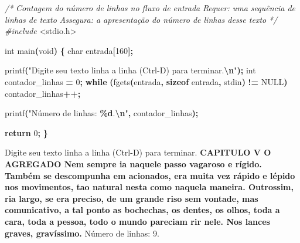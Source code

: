 \documentclass[
  11pt,
  a4paper,
]{scrbook}
\newenvironment{Shaded}{\begin{snugshade}}{\end{snugshade}}
\newcommand{\CommentTok}[1]{\textcolor[rgb]{0.56,0.35,0.01}{\textit{#1}}}
\newcommand{\ControlFlowTok}[1]{\textcolor[rgb]{0.13,0.29,0.53}{\textbf{#1}}}
\newcommand{\DataTypeTok}[1]{\textcolor[rgb]{0.13,0.29,0.53}{#1}}
\newcommand{\DecValTok}[1]{\textcolor[rgb]{0.00,0.00,0.81}{#1}}
\newcommand{\ImportTok}[1]{#1}
\newcommand{\KeywordTok}[1]{\textcolor[rgb]{0.13,0.29,0.53}{\textbf{#1}}}
\newcommand{\NormalTok}[1]{#1}
\newcommand{\OperatorTok}[1]{\textcolor[rgb]{0.81,0.36,0.00}{\textbf{#1}}}
\newcommand{\PreprocessorTok}[1]{\textcolor[rgb]{0.56,0.35,0.01}{\textit{#1}}}
\newcommand{\SpecialCharTok}[1]{\textcolor[rgb]{0.81,0.36,0.00}{\textbf{#1}}}
\newcommand{\StringTok}[1]{\textcolor[rgb]{0.31,0.60,0.02}{#1}}
\begin{document}
\begin{Shaded}
\begin{Highlighting}[]
\CommentTok{/*}
\CommentTok{Contagem do número de linhas no fluxo de entrada}
\CommentTok{Requer: uma sequência de linhas de texto}
\CommentTok{Assegura: a apresentação do número de linhas desse texto}
\CommentTok{*/}
\PreprocessorTok{\#include }\ImportTok{\textless{}stdio.h\textgreater{}}

\DataTypeTok{int}\NormalTok{ main}\OperatorTok{(}\DataTypeTok{void}\OperatorTok{)} \OperatorTok{\{}
    \DataTypeTok{char}\NormalTok{ entrada}\OperatorTok{[}\DecValTok{160}\OperatorTok{];}

\NormalTok{    printf}\OperatorTok{(}\StringTok{"Digite seu texto linha a linha (Ctrl{-}D) para terminar.}\SpecialCharTok{\textbackslash{}n}\StringTok{"}\OperatorTok{);}
    \DataTypeTok{int}\NormalTok{ contador\_linhas }\OperatorTok{=} \DecValTok{0}\OperatorTok{;}
    \ControlFlowTok{while} \OperatorTok{(}\NormalTok{fgets}\OperatorTok{(}\NormalTok{entrada}\OperatorTok{,} \KeywordTok{sizeof}\NormalTok{ entrada}\OperatorTok{,}\NormalTok{ stdin}\OperatorTok{)} \OperatorTok{!=}\NormalTok{ NULL}\OperatorTok{)}
\NormalTok{        contador\_linhas}\OperatorTok{++;}

\NormalTok{    printf}\OperatorTok{(}\StringTok{"Número de linhas: }\SpecialCharTok{\%d}\StringTok{.}\SpecialCharTok{\textbackslash{}n}\StringTok{"}\OperatorTok{,}\NormalTok{ contador\_linhas}\OperatorTok{);}

    \ControlFlowTok{return} \DecValTok{0}\OperatorTok{;}
\OperatorTok{\}}
\end{Highlighting}
\end{Shaded}

\begin{Shaded}
\begin{Highlighting}[]
\NormalTok{Digite seu texto linha a linha (Ctrl{-}D) para terminar.}
\KeywordTok{ CAPITULO V  }
\KeywordTok{ O AGREGADO  }
\KeywordTok{  }
\KeywordTok{ Nem sempre ia naquele passo vagaroso e rígido. Também se descompunha em  }
\KeywordTok{ acionados, era muita vez rápido e lépido nos movimentos, tao natural nesta como  }
\KeywordTok{ naquela maneira. Outrossim, ria largo, se era preciso, de um grande riso sem  }
\KeywordTok{ vontade, mas comunicativo, a tal ponto as bochechas, os dentes, os olhos, toda a  }
\KeywordTok{ cara, toda a pessoa, todo o mundo pareciam rir nele. Nos lances graves,  }
\KeywordTok{ gravíssimo. }
\NormalTok{Número de linhas: 9.}
\end{Highlighting}
\end{Shaded}
\end{document}
